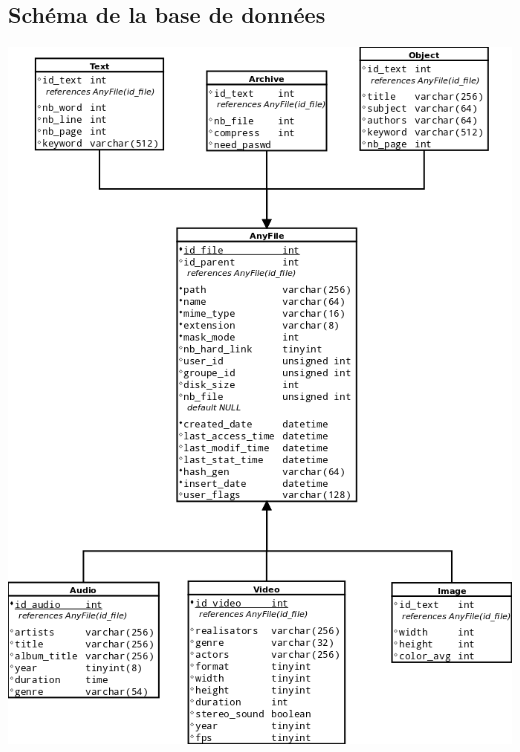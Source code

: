 \documentclass[a4paper,12pt]{report}
\begin{document}
\subsection{Schéma de la base de données}\label{bdd}
\begin{center}
\includegraphics[scale=0.37]{"images/bdd"}
\end{center}
\end{document}
